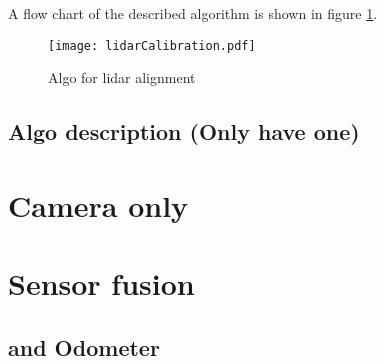 A flow chart of the described algorithm is shown in figure \ref{fig:lidarCalibration}.
\begin{figure}[htb]
	\centering
	\texttt{[image: lidarCalibration.pdf]}
	\caption{Algo for \acrshort{lidar} alignment}
	\label{fig:lidarCalibration}
\end{figure}


\subsection{Algo description (Only have one)}



\section{Camera only}



\section{Sensor fusion}


\subsection{ and Odometer}

